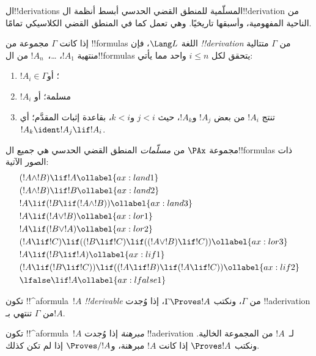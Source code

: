 \documentclass[../../../include/open-logic-section]{subfiles}
\begin{document}


ال!!{derivation}s المسلّمية للمنطق القضي الحدسي أبسط أنظمة
ال!!{derivation} من الناحية المفهومية، وأسبقها تاريخيًا. وهي تعمل كما
في المنطق القضي الكلاسيكي تمامًا.

\begin{defn}[!!^{derivability}]
إذا كانت $\Gamma$ مجموعة من !!{formula}s اللغة $\Lang L$، فإن
\emph{!!{derivation}} من $\Gamma$ متتالية منتهية $!A_1$،
\dots،~$!A_n$ من ال!!{formula}s يتحقق لكل $i \le n$ واحد مما يأتي:
\begin{enumerate}
\item $!A_i \in \Gamma$؛ أو
\item $!A_i$ مسلمة؛ أو
\item تنتج $!A_i$ من بعض $!A_j$ و$!A_k$، حيث $j < i$ و$k < i$،
  بقاعدة إثبات المقدَّم؛ أي $!A_k \ident !A_j \lif !A_i$.
\end{enumerate}
\end{defn}

\begin{defn}
مجموعة $\PAx$ من \emph{مسلّمات} المنطق القضي الحدسي هي جميع
ال!!{formula}s ذات الصور الآتية:
\begin{align}
  & (!A \land !B) \lif !A \ollabel{ax:land1}\\
  & (!A \land !B) \lif !B \ollabel{ax:land2}\\
  & !A \lif (!B \lif (!A \land !B)) \ollabel{ax:land3}\\
  & !A \lif (!A \lor !B) \ollabel{ax:lor1}\\
  & !A \lif (!B \lor !A) \ollabel{ax:lor2}\\
  & (!A \lif !C) \lif ((!B \lif !C) \lif ((!A \lor !B) \lif !C)) \ollabel{ax:lor3}\\
  & !A \lif (!B \lif !A) \ollabel{ax:lif1}\\
  & (!A \lif (!B \lif !C)) \lif ((!A \lif !B) \lif (!A \lif !C)) \ollabel{ax:lif2}\\
  & \lfalse \lif !A \ollabel{ax:lfalse1}
\end{align}
\end{defn}

\begin{defn}[!!^{derivability}]
تكون !!^a{formula}~$!A$ \emph{!!{derivable}} من $\Gamma$، ونكتب
$\Gamma \Proves !A$، إذا وُجدت !!a{derivation} من $\Gamma$ تنتهي
بـ$!A$.
\end{defn}

\begin{defn}[المبرهنات]
تكون !!^a{formula}~$!A$ \emph{مبرهنة} إذا وُجدت !!a{derivation}
لـ~$!A$ من المجموعة الخالية. ونكتب $\Proves !A$ إذا كانت $!A$
مبرهنة، و$\Proves/ !A$ إذا لم تكن كذلك.
\end{defn}
\end{document}

